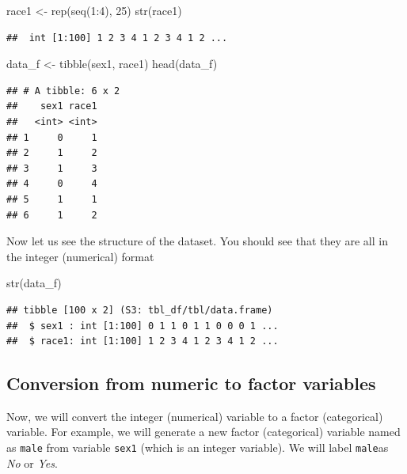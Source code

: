 \documentclass[
]{book}
\makeatletter
\newenvironment{Shaded}{\begin{snugshade}}{\end{snugshade}}
\newcommand{\DecValTok}[1]{\textcolor[rgb]{0.06,0.06,0.06}{#1}}
\newcommand{\FunctionTok}[1]{\textcolor[rgb]{0,0,0}{#1}}
\newcommand{\NormalTok}[1]{#1}
\newcommand{\OtherTok}[1]{\textcolor[rgb]{0.37,0.37,0.37}{#1}}
\newcommand{\SpecialCharTok}[1]{\textcolor[rgb]{0,0,0}{#1}}
\newenvironment{kframe}{%
\medskip{}
\setlength{\fboxsep}{.8em}
 \def\at@end@of@kframe{}%
 \ifinner\ifhmode%
  \def\at@end@of@kframe{\end{minipage}}%
  \begin{minipage}{\columnwidth}%
 \fi\fi%
 \def\FrameCommand##1{\hskip\@totalleftmargin \hskip-\fboxsep
 \colorbox{shadecolor}{##1}\hskip-\fboxsep
     \hskip-\linewidth \hskip-\@totalleftmargin \hskip\columnwidth}%
 \MakeFramed {\advance\hsize-\width
   \@totalleftmargin\z@ \linewidth\hsize
   \@setminipage}}%
 {\par\unskip\endMakeFramed%
 \at@end@of@kframe}
\renewenvironment{Shaded}{\begin{kframe}}{\end{kframe}}
\makeatother
\begin{document}
\begin{Shaded}
\begin{Highlighting}[]
\NormalTok{race1 }\OtherTok{\textless{}{-}} \FunctionTok{rep}\NormalTok{(}\FunctionTok{seq}\NormalTok{(}\DecValTok{1}\SpecialCharTok{:}\DecValTok{4}\NormalTok{), }\DecValTok{25}\NormalTok{)}
\FunctionTok{str}\NormalTok{(race1)}
\end{Highlighting}
\end{Shaded}

\begin{verbatim}
##  int [1:100] 1 2 3 4 1 2 3 4 1 2 ...
\end{verbatim}

\begin{Shaded}
\begin{Highlighting}[]
\NormalTok{data\_f }\OtherTok{\textless{}{-}} \FunctionTok{tibble}\NormalTok{(sex1, race1)}
\FunctionTok{head}\NormalTok{(data\_f)}
\end{Highlighting}
\end{Shaded}

\begin{verbatim}
## # A tibble: 6 x 2
##    sex1 race1
##   <int> <int>
## 1     0     1
## 2     1     2
## 3     1     3
## 4     0     4
## 5     1     1
## 6     1     2
\end{verbatim}

Now let us see the structure of the dataset. You should see that they are all in the integer (numerical) format

\begin{Shaded}
\begin{Highlighting}[]
\FunctionTok{str}\NormalTok{(data\_f)}
\end{Highlighting}
\end{Shaded}

\begin{verbatim}
## tibble [100 x 2] (S3: tbl_df/tbl/data.frame)
##  $ sex1 : int [1:100] 0 1 1 0 1 1 0 0 0 1 ...
##  $ race1: int [1:100] 1 2 3 4 1 2 3 4 1 2 ...
\end{verbatim}

\hypertarget{conversion-from-numeric-to-factor-variables}{%
\subsection{Conversion from numeric to factor variables}\label{conversion-from-numeric-to-factor-variables}}

Now, we will convert the integer (numerical) variable to a factor (categorical) variable. For example, we will generate a new factor (categorical) variable named as \texttt{male} from variable \texttt{sex1} (which is an integer variable). We will label \texttt{male}as \emph{No} or \emph{Yes}.
\end{document}
